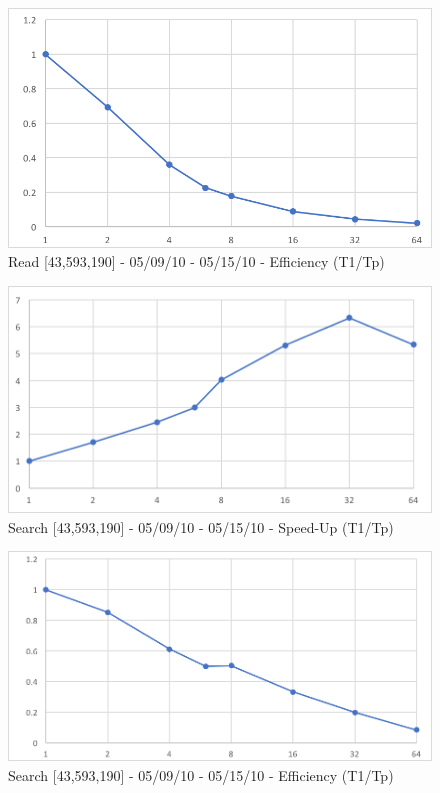 \documentclass[12pt]{article} %
\begin{document}
\begin{figure}[htb]
\caption{Read [43,593,190] - 05/09/10 - 05/15/10 - Efficiency (T1/Tp)}\label{fig:benchmark01}
\centering
\includegraphics[width=15cm,keepaspectratio]{imgs/img02.png}
\end{figure} 

\begin{figure}[htb]
\caption{Search [43,593,190] - 05/09/10 - 05/15/10 - Speed-Up (T1/Tp)}\label{fig:benchmark01}
\centering
\includegraphics[width=15cm,keepaspectratio]{imgs/img03.png}
\end{figure} 

\begin{figure}[htb]
\caption{Search [43,593,190] - 05/09/10 - 05/15/10 - Efficiency (T1/Tp)}\label{fig:benchmark01}
\centering
\includegraphics[width=15cm,keepaspectratio]{imgs/img04.png}
\end{figure} 
\end{document}
